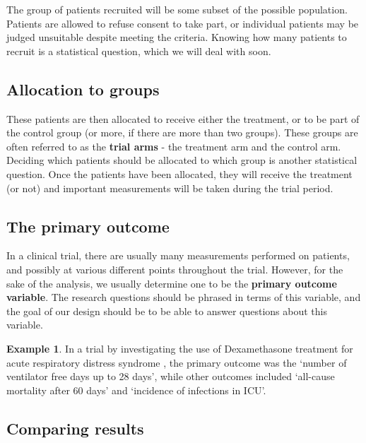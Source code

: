 \documentclass[
  openany]{book}
\theoremstyle{definition}
\theoremstyle{definition}
\newtheorem{example}{Example}[chapter]
\theoremstyle{definition}
\theoremstyle{definition}
\theoremstyle{remark}
\begin{document}
The group of patients recruited will be some subset of the possible population. Patients are allowed to refuse consent to take part, or individual patients may be judged unsuitable despite meeting the criteria. Knowing how many patients to recruit is a statistical question, which we will deal with soon.

\subsection*{Allocation to groups}\label{allocation-to-groups}

These patients are then allocated to receive either the treatment, or to be part of the control group (or more, if there are more than two groups). These groups are often referred to as the \textbf{trial arms} - the treatment arm and the control arm. Deciding which patients should be allocated to which group is another statistical question. Once the patients have been allocated, they will receive the treatment (or not) and important measurements will be taken during the trial period.

\subsection*{The primary outcome}\label{the-primary-outcome}

In a clinical trial, there are usually many measurements performed on patients, and possibly at various different points throughout the trial. However, for the sake of the analysis, we usually determine one to be the \textbf{primary outcome variable}. The research questions should be phrased in terms of this variable, and the goal of our design should be to be able to answer questions about this variable.

\begin{example}
In a trial by \citet{villar2020dexamethasone} investigating the use of Dexamethasone treatment for acute respiratory distress syndrome , the primary outcome was the `number of ventilator free days up to 28 days', while other outcomes included `all-cause mortality after 60 days' and `incidence of infections in ICU'.
\end{example}

\subsection*{Comparing results}\label{comparing-results}
\end{document}
